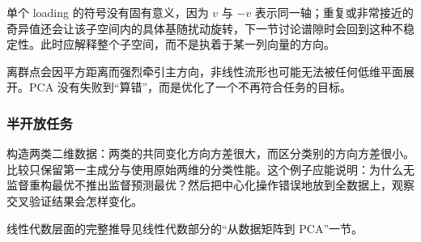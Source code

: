 单个 loading 的符号没有固有意义，因为 \(v\) 与 \(-v\) 表示同一轴；重复或非常接近的奇异值还会让该子空间内的具体基随扰动旋转，下一节讨论谱隙时会回到这种不稳定性。此时应解释整个子空间，而不是执着于某一列向量的方向。

离群点会因平方距离而强烈牵引主方向，非线性流形也可能无法被任何低维平面展开。PCA 没有失败到``算错''，而是优化了一个不再符合任务的目标。

\subsubsection{半开放任务}

构造两类二维数据：两类的共同变化方向方差很大，而区分类别的方向方差很小。比较只保留第一主成分与使用原始两维的分类性能。这个例子应能说明：为什么无监督重构最优不推出监督预测最优？然后把中心化操作错误地放到全数据上，观察交叉验证结果会怎样变化。

线性代数层面的完整推导见线性代数部分的``从数据矩阵到 PCA''一节。
